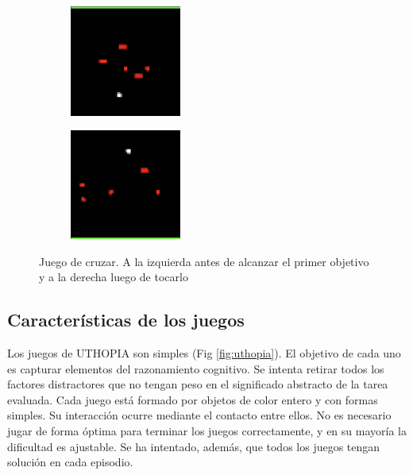 \begin{figure}[ht!]
    \centering
    \begin{subfigure}
      \centering
      \includegraphics[width=0.4\textwidth]{Graphics/uthopia_street_1.png}
      \label{fig:uthopia_street_1}
    \end{subfigure}%
    \begin{subfigure}
      \centering
      \includegraphics[width=0.4\textwidth]{Graphics/uthopia_street_2.png}
      \label{fig:uthopia_street_2}
    \end{subfigure}%
    \caption{Juego de cruzar. A la izquierda antes de alcanzar el primer objetivo y a la derecha luego de tocarlo}
    \label{fig:uthopia_street}
\end{figure}

\subsection{Características de los juegos}

Los juegos de UTHOPIA son simples (Fig \ref{fig:uthopia}). El objetivo de cada uno es capturar elementos del razonamiento cognitivo. Se intenta retirar todos los factores distractores que no tengan peso en el significado abstracto de la tarea evaluada. Cada juego está formado por objetos de color entero y con formas simples. Su interacción ocurre mediante el contacto entre ellos. No es necesario jugar de forma óptima para terminar los juegos correctamente, y en su mayoría la dificultad es ajustable. Se ha intentado, además, que todos los juegos tengan solución en cada episodio. 

